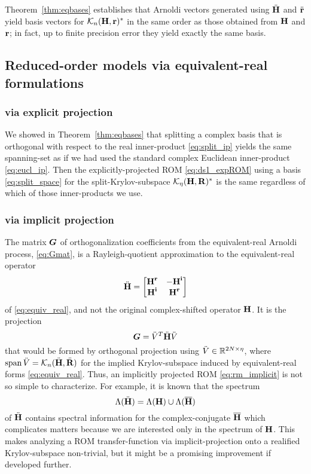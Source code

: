 Theorem~\ref{thm:eqbases} establishes that Arnoldi vectors generated using ${\ddot{\textbf{\textup{H}}}}$ and $\ddot{\textbf{\textup{r}}}$
yield basis vectors for $\mathcal{K}_{n}({\textbf{\textup{H}}},{\textbf{\textup{r}}})^*$ in the same order as those obtained from $\textbf{\textup{H}}$ and $\textbf{\textup{r}}$;
in fact, up to finite precision error they yield exactly the same basis.

\subsection{Reduced-order models via equivalent-real formulations}
\subsubsection{via explicit projection}
We showed in Theorem~\ref{thm:eqbases} that splitting a complex basis that is orthogonal with respect to the real inner-product \eqref{eq:split_ip} yields the same spanning-set as if we had used the standard complex Euclidean inner-product \eqref{eq:eucl_ip}.  Then the explicitly-projected ROM \eqref{eq:ds1_expROM} using a basis \eqref{eq:split_space} for the split-Krylov-subspace  $\mathcal{K}_{\eta}({\textbf{\textup{H}}},{\textbf{\textup{R}}})^*$  is the same regardless of which of those inner-products we use. 

\subsubsection{via implicit projection}
  The matrix $\boldsymbol{G}$ of orthogonalization coefficients from the equivalent-real Arnoldi process, \eqref{eq:Gmat}, is a Rayleigh-quotient approximation to the equivalent-real operator
\[
{\ddot{\textbf{\textup{H}}}} = \begin{bmatrix} \textbf{\textup{H}}^{\mathrm{\bf{r}}}_{} & -\textbf{\textup{H}}^{\mathrm{\bf{i}}}_{}\\ \textbf{\textup{H}}^{\mathrm{\bf{i}}}_{} & \textbf{\textup{H}}^{\mathrm{\bf{r}}}_{} \end{bmatrix} 
\]
 of \eqref{eq:equiv_real}, and not the original complex-shifted operator $\textbf{\textup{H}}$.   It is the projection 
\[
\boldsymbol{G} = \ddot{V}^T {\ddot{\textbf{\textup{H}}}} \ddot{V}
\]
that would be formed by orthogonal projection using $\ddot{V}\in\mathbb{R}^{2N \times \eta}$, where $\operatorname*{span} \ddot{V} = \mathcal{K}_{n}({{\ddot{\textbf{\textup{H}}}}},{{\ddot{\textbf{\textup{R}}}}})$ for the implied Krylov-subspace   induced by equivalent-real forms \eqref{eq:equiv_real}.  Thus, an implicitly projected ROM \eqref{eq:rm_implicit} is not so simple to characterize.  For example, it is known that the spectrum 
\[
\Lambda({\ddot{\textbf{\textup{H}}}}) = \Lambda(\textbf{\textup{H}}) \cup \Lambda(\overline{\textbf{\textup{H}}})
\]
of ${\ddot{\textbf{\textup{H}}}}$ contains spectral information for the complex-conjugate $\overline{\textbf{\textup{H}}}$ which complicates matters because  we are interested only in the spectrum of $\textbf{\textup{H}}$.  This makes analyzing a ROM transfer-function via implicit-projection onto a realified Krylov-subspace  non-trivial, but it might be a promising improvement if developed further.




